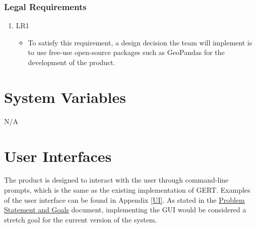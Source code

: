 \documentclass[12pt, titlepage]{article}
\begin{document}
\subsubsection{Legal Requirements}

\begin{enumerate}
    \item LR1
    \begin{itemize}
        \item To satisfy this requirement, a design decision the team will implement is to use free-use open-source packages such as GeoPandas for the development of the product.
    \end{itemize}
\end{enumerate}

\section{System Variables}
N/A




\section{User Interfaces}
The product is designed to interact with the user through command-line prompts, which is the same as the existing implementation of GERT. Examples of the user interface can be found in Appendix \ref{UI}.
As stated in the \href{https://github.com/paezha/PyERT-BLACK/blob/main/docs/ProblemStatementAndGoals/ProblemStatement.pdf}{Problem Statement and Goals} \citep{ProblemStatement} document, implementing the GUI would be considered a stretch goal for the current version of the system.


\end{document}
